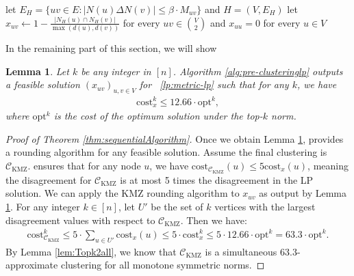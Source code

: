 \documentclass[11pt]{article}
\newcommand{\cost}{\mathrm{cost}}
\newtheorem{lemma}[theorem]{Lemma}
\newcommand{\opt}{{\mathrm{opt}}}
\begin{document}
\begin{CJK*}{UTF8}{gbsn}
\begin{algorithm}[t]
    \caption{Construction of norm-oblivious solution $x$ to metric LP. \\
     \textbf{Input}: Graph $G = (V, E)$\\
\textbf{Output}: $(x_{uv})_{u, v \in V} $ }
\label{alg:pre-clusteringlp}
    \begin{algorithmic}[1]
    \State let $E_H = \{uv \in E: |N(u) \Delta N(v)| \leq \beta \cdot M_{uv}\}$ and $H = (V, E_H)$
 \label{alg:pre-clusteringlpfirst}
    \State let $x_{uv} \leftarrow 1 - \frac{|N_{H}(u) \cap N_{H}(v)|}{\mathrm{\max}(d(u), d(v))}$ for every $uv \in {V \choose 2}$ and $x_{uu} = 0$ for every $u \in V$
    \EndFunction
\end{algorithmic}    
\end{algorithm}

In the remaining part of this section, we will show 
\begin{lemma}
\label{lemma:boundratiomain}
Let $k$ be any integer in $[n]$. 
Algorithm \ref{alg:pre-clusteringlp} outputs a feasible solution $(x_{uv})_{u, v \in V}$ for ~\eqref{lp:metric-lp} such that for any $k$, we have
\begin{align*}
    \cost^k_x \leq 12.66 \cdot \opt^k, 
\end{align*}
where $\opt^k$ is the cost of the optimum solution under the top-$k$ norm. 
\end{lemma}

\begin{proof}[Proof of Theorem \ref{thm:sequentialAlgorithm}]
    Once we obtain Lemma \ref{lemma:boundratiomain}, \cite{kalhan2019correlation} provides a rounding algorithm for any feasible solution. Assume the final clustering is $\mathcal{C}_{\text{KMZ}}$. \cite{kalhan2019correlation} ensures that for any node $u$, we have $\cost_{\mathcal{C}_{\text{KMZ}}}(u) \leq 5 \cost_x(u)$, meaning the disagreement for $\mathcal{C}_{\text{KMZ}}$ is at most 5 times the disagreement in the LP solution. We can apply the KMZ rounding algorithm to $x_{uv}$ as output by Lemma \ref{lemma:boundratiomain}. For any integer $k \in [n]$, let $U'$ be the set of $k$ vertices with the largest disagreement values with respect to $\mathcal{C}_{\text{KMZ}}$. Then we have:
    \begin{align*}
        \cost^k_{\mathcal{C}_{\text{KMZ}}} \le 5 \cdot \sum_{u \in U'} \cost_x(u) \le 5 \cdot \cost^k_x \leq 5 \cdot 12.66\cdot \opt^k =  63.3 \cdot \opt^k.
    \end{align*}
    By Lemma \ref{lem:Topk2all}, we know that $\mathcal{C}_{\text{KMZ}}$ is a simultaneous 63.3-approximate clustering for all monotone symmetric norms.
\end{proof}


\end{CJK*}
\end{document}
